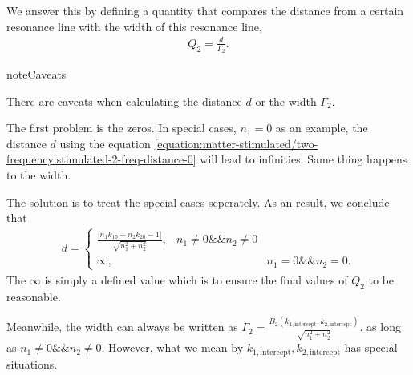 \documentclass[letterpaper,12pt,english]{sphinxmanual}
\begin{document}
We answer this by defining a quantity that compares the distance from a certain resonance line with the width of this resonance line,
\begin{equation*}
\begin{split}Q_2 = \frac{d}{\Gamma_2}.\end{split}
\end{equation*}
\begin{sphinxadmonition}{note}{Caveats}

There are caveats when calculating the distance \(d\) or the width \(\Gamma_2\).

The first problem is the zeros. In special cases, \(n_1=0\) as an example, the distance \(d\) using the equation \eqref{equation:matter-stimulated/two-frequency:stimulated-2-freq-distance-0} will lead to infinities. Same thing happens to the width.

The solution is to treat the special cases seperately. As an result, we conclude that
\label{\detokenize{matter-stimulated/two-frequency:equation-stimulated-2-freq-distance-d}}\begin{equation}\label{equation:matter-stimulated/two-frequency:stimulated-2-freq-distance-d}
\begin{split}d=\begin{cases}
\frac{\lvert n_1 k_{10} + n_2 k_{20} -1 \rvert}{\sqrt{ n_1^2 + n_2 ^2 }}, & n_1\neq 0 \&\& n_2 \neq 0 \\
\infty , & & n_1= 0 \&\& n_2 = 0.
\end{cases}\end{split}
\end{equation}
The \(\infty\) is simply a defined value which is to ensure the final values of \(Q_2\) to be reasonable.

Meanwhile, the width can always be written as \(\Gamma_2 = \frac{B_2(k_{1,\mathrm{intercept}},k_{2,\mathrm{intercept}})}{\sqrt{n_1^2 + n_2^2}}.\) as long as \(n_1\neq 0\&\& n_2\neq 0\). However, what we mean by \(k_{1,\mathrm{intercept}},k_{2,\mathrm{intercept}}\) has special situations.


\end{sphinxadmonition}
\end{document}
